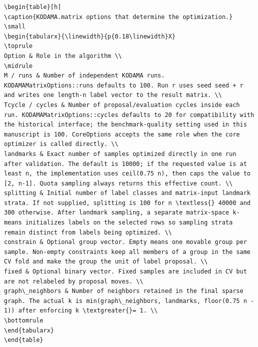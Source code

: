 \documentclass[twoside,11pt]{article}
\begin{document}
\begin{small}
\begin{verbatim}
\begin{table}[h]
\caption{KODAMA.matrix options that determine the optimization.}
\small
\begin{tabularx}{\linewidth}{p{0.18\linewidth}X}
\toprule
Option & Role in the algorithm \\
\midrule
M / runs & Number of independent KODAMA runs. KODAMAMatrixOptions::runs defaults to 100. Run r uses seed seed + r and writes one length-n label vector to the result matrix. \\
Tcycle / cycles & Number of proposal/evaluation cycles inside each run. KODAMAMatrixOptions::cycles defaults to 20 for compatibility with the historical interface; the benchmark-quality setting used in this manuscript is 100. CoreOptions accepts the same role when the core optimizer is called directly. \\
landmarks & Exact number of samples optimized directly in one run after validation. The default is 10000; if the requested value is at least n, the implementation uses ceil(0.75 n), then caps the value to [2, n-1]. Quota sampling always returns this effective count. \\
splitting & Initial number of label classes and matrix-input landmark strata. If not supplied, splitting is 100 for n \textless{} 40000 and 300 otherwise. After landmark sampling, a separate matrix-space k-means initializes labels on the selected rows so sampling strata remain distinct from labels being optimized. \\
constrain & Optional group vector. Empty means one movable group per sample. Non-empty constraints keep all members of a group in the same CV fold and make the group the unit of label proposal. \\
fixed & Optional binary vector. Fixed samples are included in CV but are not relabeled by proposal moves. \\
graph\_neighbors & Number of neighbors retained in the final sparse graph. The actual k is min(graph\_neighbors, landmarks, floor(0.75 n - 1)) after enforcing k \textgreater{}= 1. \\
\bottomrule
\end{tabularx}
\end{table}


\end{verbatim}
\end{small}
\end{document}
